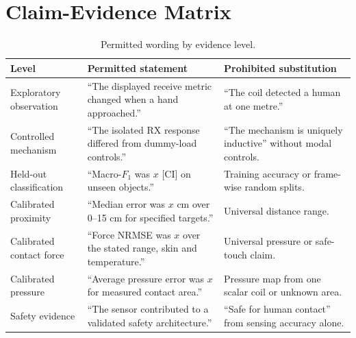 \documentclass[10pt]{article}
\begin{document}
\section{Claim-Evidence Matrix}
\begin{table}[h]
\centering\small
\caption{Permitted wording by evidence level.}
\begin{tabularx}{\linewidth}{@{}p{2.2cm}X X@{}}
\toprule
Level & Permitted statement & Prohibited substitution\\
\midrule
Exploratory observation & ``The displayed receive metric changed when a hand approached.'' & ``The coil detected a human at one metre.''\\
Controlled mechanism & ``The isolated RX response differed from dummy-load controls.'' & ``The mechanism is uniquely inductive'' without modal controls.\\
Held-out classification & ``Macro-$F_1$ was $x$ [CI] on unseen objects.'' & Training accuracy or frame-wise random splits.\\
Calibrated proximity & ``Median error was $x$ cm over 0--15 cm for specified targets.'' & Universal distance range.\\
Calibrated contact force & ``Force NRMSE was $x$ over the stated range, skin and temperature.'' & Universal pressure or safe-touch claim.\\
Calibrated pressure & ``Average pressure error was $x$ for measured contact area.'' & Pressure map from one scalar coil or unknown area.\\
Safety evidence & ``The sensor contributed to a validated safety architecture.'' & ``Safe for human contact'' from sensing accuracy alone.\\
\bottomrule
\end{tabularx}
\end{table}
\end{document}
